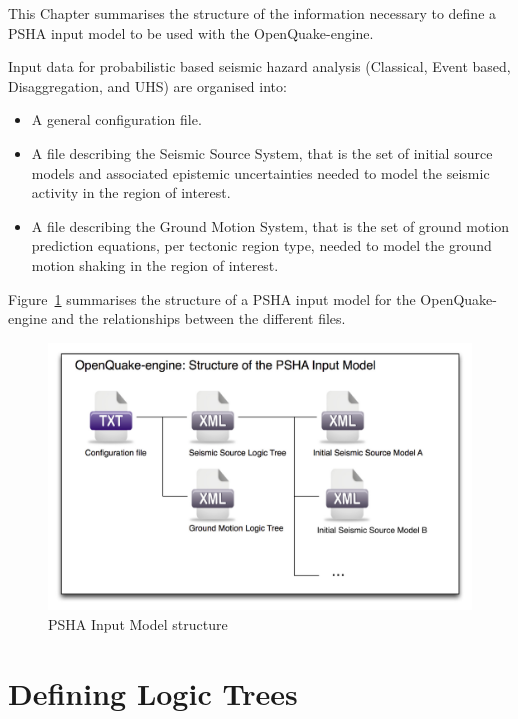 This Chapter summarises the structure of the information necessary to define
a PSHA input model to be used with the OpenQuake-engine.

Input data for probabilistic based seismic hazard analysis (Classical, Event
based, Disaggregation, and UHS) are organised into:

\begin{itemize}

	\item A general configuration file.

    \item A file describing the Seismic Source System, that is the set of
	initial source models and associated epistemic uncertainties needed to
	model the seismic activity in the region of interest.

    \item A file describing the Ground Motion System, that is the set of
	ground motion prediction equations, per tectonic region type, needed to
	model the ground motion shaking in the region of interest.

\end{itemize}

Figure~\ref{fig:psha_input} summarises the structure of a PSHA input model
for the OpenQuake-engine and the relationships between the different files.

\begin{figure}[!ht]
\centering
\includegraphics[width=14cm]{figures/hazard/psha_input_structure.pdf}
\caption{PSHA Input Model structure}
\label{fig:psha_input}
\end{figure}


\section{Defining Logic Trees}

\label{sec:logic_trees}

